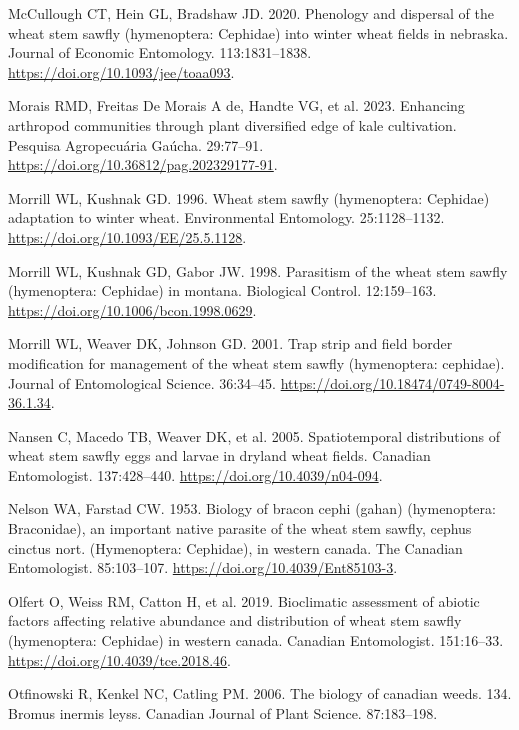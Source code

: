 \documentclass[
]{article}
\newlength{\cslhangindent}
\newenvironment{CSLReferences}[2] %
 {\begin{list}{}{%
  \setlength{\itemindent}{0pt}
  \setlength{\leftmargin}{0pt}
  \setlength{\parsep}{0pt}
  \ifodd #1
   \setlength{\leftmargin}{\cslhangindent}
   \setlength{\itemindent}{-1\cslhangindent}
  \fi
  \setlength{\itemsep}{#2\baselineskip}}}
 {\end{list}}
\begin{document}
\begin{CSLReferences}{0}{1}
McCullough CT, Hein GL, Bradshaw JD. 2020. Phenology and dispersal of
the wheat stem sawfly (hymenoptera: Cephidae) into winter wheat fields
in nebraska. Journal of Economic Entomology. 113:1831--1838.
\url{https://doi.org/10.1093/jee/toaa093}.

Morais RMD, Freitas De Morais A de, Handte VG, et al. 2023. Enhancing
arthropod communities through plant diversified edge of kale
cultivation. Pesquisa Agropecuária Gaúcha. 29:77--91.
\url{https://doi.org/10.36812/pag.202329177-91}.

Morrill WL, Kushnak GD. 1996. Wheat stem sawfly (hymenoptera: Cephidae)
adaptation to winter wheat. Environmental Entomology. 25:1128--1132.
\url{https://doi.org/10.1093/EE/25.5.1128}.

Morrill WL, Kushnak GD, Gabor JW. 1998. Parasitism of the wheat stem
sawfly (hymenoptera: Cephidae) in montana. Biological Control.
12:159--163. \url{https://doi.org/10.1006/bcon.1998.0629}.

Morrill WL, Weaver DK, Johnson GD. 2001. Trap strip and field border
modification for management of the wheat stem sawfly (hymenoptera:
cephidae). Journal of Entomological Science. 36:34--45.
\url{https://doi.org/10.18474/0749-8004-36.1.34}.

Nansen C, Macedo TB, Weaver DK, et al. 2005. Spatiotemporal
distributions of wheat stem sawfly eggs and larvae in dryland wheat
fields. Canadian Entomologist. 137:428--440.
\url{https://doi.org/10.4039/n04-094}.

Nelson WA, Farstad CW. 1953. Biology of bracon cephi (gahan)
(hymenoptera: Braconidae), an important native parasite of the wheat
stem sawfly, cephus cinctus nort. (Hymenoptera: Cephidae), in western
canada. The Canadian Entomologist. 85:103--107.
\url{https://doi.org/10.4039/Ent85103-3}.

Olfert O, Weiss RM, Catton H, et al. 2019. Bioclimatic assessment of
abiotic factors affecting relative abundance and distribution of wheat
stem sawfly (hymenoptera: Cephidae) in western canada. Canadian
Entomologist. 151:16--33. \url{https://doi.org/10.4039/tce.2018.46}.

Otfinowski R, Kenkel NC, Catling PM. 2006. The biology of canadian
weeds. 134. Bromus inermis leyss. Canadian Journal of Plant Science.
87:183--198.


\end{CSLReferences}
\end{document}

